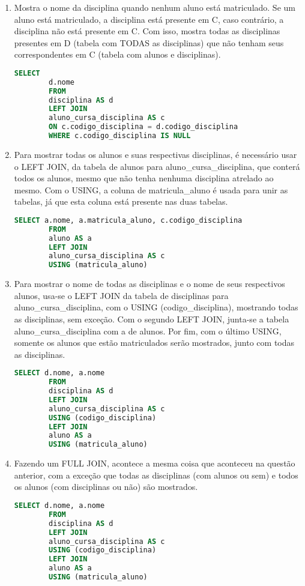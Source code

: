 \documentclass{article}
\begin{document}
\begin{enumerate}[label=\alph*)]
    \item Mostra o nome da disciplina quando nenhum aluno está matriculado. Se um aluno está matriculado, a disciplina está presente em C, caso contrário, a disciplina não está presente em C. Com isso, mostra todas as disciplinas presentes em D (tabela com TODAS as disciplinas) que não tenham seus correspondentes em C (tabela com alunos e disciplinas).
    \begin{lstlisting}[language=SQL]
        SELECT
        d.nome
        FROM
        disciplina AS d
        LEFT JOIN
        aluno_cursa_disciplina AS c
        ON c.codigo_disciplina = d.codigo_disciplina
        WHERE c.codigo_disciplina IS NULL
    \end{lstlisting}

    \item Para mostrar todas os alunos e suas respectivas disciplinas, é necessário usar o LEFT JOIN, da tabela de alunos para aluno\_cursa\_disciplina, que conterá todos os alunos, mesmo que não tenha nenhuma disciplina atrelado ao mesmo. Com o USING, a coluna de matricula\_aluno é usada para unir as tabelas, já que esta coluna está presente nas duas tabelas.
    \begin{lstlisting}[language=SQL]
        SELECT a.nome, a.matricula_aluno, c.codigo_disciplina
        FROM
        aluno AS a
        LEFT JOIN
        aluno_cursa_disciplina AS c
        USING (matricula_aluno)        
    \end{lstlisting}

    \item Para mostrar o nome de todas as disciplinas e o nome de seus respectivos alunos, usa-se o LEFT JOIN da tabela de disciplinas para aluno\_cursa\_disciplina, com o USING (codigo\_disciplina), mostrando todas as disciplinas, sem exceção. Com o segundo LEFT JOIN, junta-se a tabela aluno\_cursa\_disciplina com a de alunos. Por fim, com o último USING, somente os alunos que estão matriculados serão mostrados, junto com todas as disciplinas. 
    \begin{lstlisting}[language=SQL]
        SELECT d.nome, a.nome
        FROM
        disciplina AS d
        LEFT JOIN
        aluno_cursa_disciplina AS c
        USING (codigo_disciplina)
        LEFT JOIN
        aluno AS a
        USING (matricula_aluno)
    \end{lstlisting}

    \item Fazendo um FULL JOIN, acontece a mesma coisa que aconteceu na questão anterior, com a exceção que todas as disciplinas (com alunos ou sem) e todos os alunos (com disciplinas ou não) são mostrados.
    \begin{lstlisting}[language=SQL]
        SELECT d.nome, a.nome
        FROM
        disciplina AS d
        LEFT JOIN
        aluno_cursa_disciplina AS c
        USING (codigo_disciplina)
        LEFT JOIN
        aluno AS a
        USING (matricula_aluno)
        

\end{lstlisting}
\end{enumerate}
\end{document}

